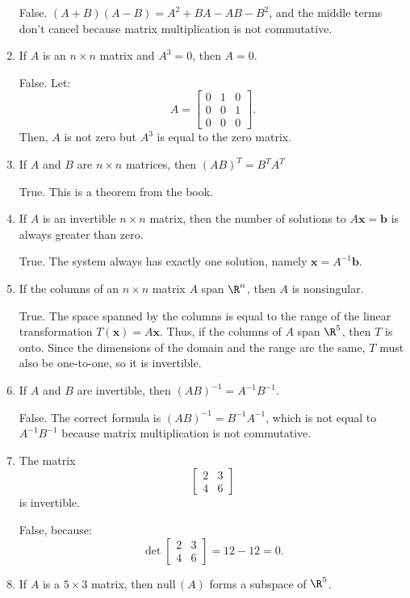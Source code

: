 \documentclass[12pt]{article}
\begin{document}
\begin{enumerate}
False. $(A+B)(A-B)=A^2+BA-AB-B^2$, and the middle terms don't cancel because matrix multiplication is not commutative.

\item If $A$ is an $n\times n$ matrix and $A^3=0$, then $A=0$.

False. Let:
\[
A=
\begin{bmatrix}
0&1&0\\0&0&1\\0&0&0
\end{bmatrix}.
\]
Then, $A$ is not zero but $A^3$ is equal to the zero matrix.

\item If $A$ and $B$ are $n\times n$ matrices, then $(AB)^T=B^TA^T$

True. This is a theorem from the book.

\item If $A$ is an invertible $n\times n$ matrix, then the number of solutions to $A\mathbf{x}=\mathbf{b}$ is always greater than zero.

True. The system always has exactly one solution, namely $\mathbf{x}=A^{-1}\mathbf{b}$.

\item If the columns of an $n \times n$ matrix $A$ span $\R^n$, then $A$ is nonsingular.

True. The space spanned by the columns is equal to the range of the linear transformation $T(\mathbf{x})=A\mathbf{x}$. Thus, if the columns of $A$ span $\R^5$, then $T$ is onto. Since the dimensions of the domain and the range are the same, $T$ must also be one-to-one, so it is invertible.

\item If $A$ and $B$ are invertible, then $(AB)^{-1}=A^{-1}B^{-1}$.

False. The correct formula is $(AB)^{-1}=B^{-1}A^{-1}$, which is not equal to $A^{-1}B^{-1}$ because matrix multiplication is not commutative.

\item The matrix
\[
\begin{bmatrix}2&3\\4&6\end{bmatrix}
\]
is invertible.

False, because:
\[
\det\begin{bmatrix}2&3\\4&6\end{bmatrix} = 12-12=0.
\]

\item If $A$ is a $5\times 3$ matrix, then $\text{null}\,(A)$ forms a subspace of $\R^5$.


\end{enumerate}
\end{document}

